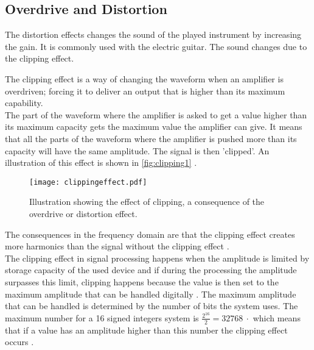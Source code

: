 \subsection{Overdrive and Distortion} 

The distortion effects changes the sound of the played instrument by increasing the gain. It is commonly used with the electric guitar. The sound changes due to the clipping effect. \\

The clipping effect is a way of changing the waveform when an amplifier is overdriven; forcing it to deliver an output that is higher than its maximum capability. \\
The part of the waveform where the amplifier is asked to get a value higher than its maximum capacity gets the maximum value the amplifier can give. It means that all the parts of the waveform where the amplifier is pushed more than its capacity will have the same amplitude. The signal is then 'clipped'. An illustration of this effect is shown in \autoref{fig:clipping1} \citep{distortion_clipping1}.\\

\begin{figure} [htbp]
	\centering
  \texttt{[image: clippingeffect.pdf]}
  \caption{Illustration showing the effect of clipping, a consequence of the overdrive or distortion effect.}
  \label{fig:clipping1}
\end{figure} \citep{distortion_clipping1}


The consequences in the frequency domain are that the clipping effect creates more harmonics than the signal without the clipping effect \citep{distortion_harmonics}. \\

The clipping effect in signal processing happens when the amplitude is limited by storage capacity of the used device and if during the processing the amplitude surpasses this limit, clipping happens because the value is then set to the maximum amplitude that can be handled digitally \citep{distortion_digital}. The maximum amplitude that can be handled is determined by the number of bits the system uses. The maximum number for a \SI{16}{\bit}  signed integers system is $\frac{2^{16}}{2} = \SI{32768}{\cdot}$ which means that if a value has an amplitude higher than this number the clipping effect occurs \citep{distortion_digitalcalc}.  \\ 

